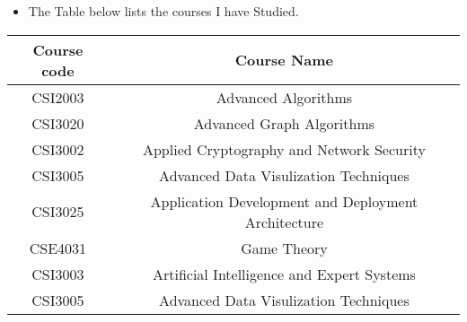 \documentclass{myresume}
\begin{document}
            \begin{itemize}
                \item The Table below lists the courses I have Studied.
                
            \end{itemize}
        \begin{center}
        \begin{tabular}{| c | c |}
                \hline
                \textbf{Course code} & \textbf{Course Name} \\
                \hline
                CSI2003 & Advanced Algorithms \\
                \hline
                CSI3020 & Advanced Graph Algorithms \\
                \hline
                CSI3002 & Applied Cryptography and Network Security \\
                \hline
                CSI3005 & Advanced Data Visulization Techniques \\
                \hline
                CSI3025 & Application Development and Deployment Architecture  \\
                \hline
                CSE4031 & Game Theory  \\
                \hline
                CSI3003 & Artificial Intelligence and Expert Systems \\
                \hline
                CSI3005 & Advanced Data Visulization Techniques \\
                \hline
            \end{tabular}
            \end{center}
         
        
\end{document}
